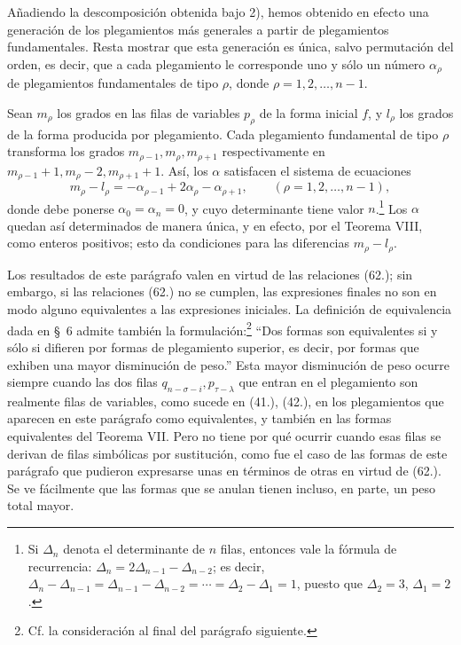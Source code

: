 \documentclass[11pt]{article}
\begin{document}
Añadiendo la descomposición obtenida bajo 2), hemos obtenido en efecto una generación de los plegamientos más generales a partir de plegamientos fundamentales. Resta mostrar que esta generación es única, salvo permutación del orden, es decir, que a cada plegamiento le corresponde uno y sólo un número $\alpha_\rho$ de plegamientos fundamentales de tipo $\rho$, donde $\rho=1,2,\ldots,n-1$.

Sean $m_\rho$ los grados en las filas de variables $p_\rho$ de la forma inicial $f$, y $l_\rho$ los grados de la forma producida por plegamiento. Cada plegamiento fundamental de tipo $\rho$ transforma los grados $m_{\rho-1},m_\rho,m_{\rho+1}$ respectivamente en $m_{\rho-1}+1,m_\rho-2,m_{\rho+1}+1$. Así, los $\alpha$ satisfacen el sistema de ecuaciones
\begin{equation}
 m_\rho-l_\rho=-\alpha_{\rho-1}+2\alpha_\rho-\alpha_{\rho+1},
 \qquad (\rho=1,2,\ldots,n-1),
\tag{70}
\end{equation}
donde debe ponerse $\alpha_0=\alpha_n=0$, y cuyo determinante tiene valor $n$.\footnote{Si $\Delta_n$ denota el determinante de $n$ filas, entonces vale la fórmula de recurrencia: $\Delta_n=2\Delta_{n-1}-\Delta_{n-2}$; es decir, $\Delta_n-\Delta_{n-1}=\Delta_{n-1}-\Delta_{n-2}=\cdots=\Delta_2-\Delta_1=1$, puesto que $\Delta_2=3$, $\Delta_1=2$.} Los $\alpha$ quedan así determinados de manera única, y en efecto, por el Teorema VIII, como enteros positivos; esto da condiciones para las diferencias $m_\rho-l_\rho$.

Los resultados de este parágrafo valen en virtud de las relaciones (62.); sin embargo, si las relaciones (62.) no se cumplen, las expresiones finales no son en modo alguno equivalentes a las expresiones iniciales. La definición de equivalencia dada en \S\ 6 admite también la formulación:\footnote{Cf. la consideración al final del parágrafo siguiente.} ``Dos formas son equivalentes si y sólo si difieren por formas de plegamiento superior, es decir, por formas que exhiben una mayor disminución de peso.'' Esta mayor disminución de peso ocurre siempre cuando las dos filas $q_{n-\sigma-i},p_{\tau-\lambda}$ que entran en el plegamiento son realmente filas de variables, como sucede en (41.), (42.), en los plegamientos que aparecen en este parágrafo como equivalentes, y también en las formas equivalentes del Teorema VII. Pero no tiene por qué ocurrir cuando esas filas se derivan de filas simbólicas por sustitución, como fue el caso de las formas de este parágrafo que pudieron expresarse unas en términos de otras en virtud de (62.). Se ve fácilmente que las formas que se anulan tienen incluso, en parte, un peso total mayor.
\end{document}
